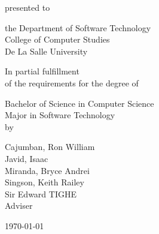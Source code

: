 %
%
%                 

\begin{titlepage}
	\centering
	
	
	
	\vspace{0.7cm}
	
	presented to\\
	
	\vspace{0.5cm}
	
	the Department of Software Technology\\
	College of Computer Studies\\
	De La Salle University
	
	\vspace{1cm}
	
	In partial fulfillment\\
	of the requirements for the degree of\\
	
	\vspace{0.5cm}
	
	Bachelor of Science in Computer Science\\
	Major in Software Technology
	\vspace{1.75cm}
	\\by\\
	
	
	\vspace{1cm}
	
	Cajumban, Ron William\\
	Javid, Isaac  \\
	Miranda, Bryce Andrei  \\
	Singson, Keith Railey \\
	
	\vspace{1.75cm}
	Sir Edward TIGHE \\
	Adviser
	
	\today
\end{titlepage}
